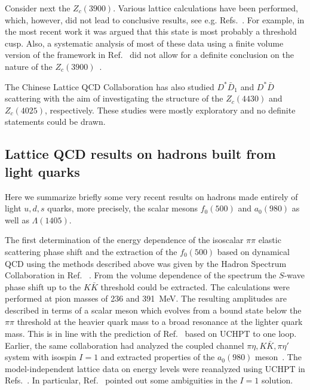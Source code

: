 Consider next the $Z_c(3900)$. Various lattice calculations have
been performed, which, however, did not lead to  conclusive results,
see e.g. 
Refs.~\cite{Prelovsek:2013xba,Prelovsek:2014swa,Chen:2014afa,
Ikeda:2016zwx}. 
For example, in the most recent work \cite{Ikeda:2016zwx} it
was argued that this state is most probably a threshold cusp. Also,
a systematic analysis of most of these data using a finite volume version of 
the framework in Ref.~\cite{Albaladejo:2015lob} did not allow
for a definite conclusion
on the nature of the $Z_c(3900)$~\cite{Albaladejo:2016jsg}.

The Chinese Lattice QCD Collaboration has also studied $D^* \bar D_1$ 
\cite{Meng:2009qt,Chen:2016lkl} and $D^*\bar D$ scattering 
\cite{Chen:2015jwa}
with the aim of investigating the structure
of the $Z_c(4430)$ and $Z_c(4025)$, respectively.  These studies were
mostly exploratory and no definite statements could be drawn.

\subsection{Lattice QCD results on hadrons built from light quarks}
\label{sec:latres2}

Here we summarize briefly some very recent results on hadrons made 
entirely of light $u,d,s$ quarks, more precisely, the scalar mesons 
$f_0(500)$  and $a_0(980)$ as well as $\Lambda(1405)$.

The  first determination of the energy dependence of the isoscalar $\pi\pi$
elastic scattering phase shift and the extraction of the $f_0(500)$ based on
dynamical QCD using the methods described above was given by the Hadron Spectrum
Collaboration in Ref.~ \cite{Briceno:2016mjc}.
From the volume dependence of the spectrum the $S$-wave phase shift up to the
$K\bar K$ threshold could be extracted. The calculations were performed at pion
masses of 236 and 391~MeV. The resulting amplitudes are described in terms of a
scalar meson which evolves from a bound state below the $\pi\pi$ threshold at
the heavier quark mass to a broad resonance at the lighter quark mass.
{This is } in line with the prediction of Ref.~\cite{Hanhart:2008mx} based
on UCHPT to one loop.
 Earlier, the same collaboration had analyzed the coupled channel
$\pi\eta, K\bar K, \pi\eta'$ system with isospin $I=1$ and extracted properties
of the $a_0(980)$ meson~\cite{Dudek:2016cru}. {The model-independent
lattice data on energy levels were reanalyzed using UCHPT in
Refs.~\cite{Guo:2016zep,Doring:2016bdr}.} In particular, Ref.~\cite{Guo:2016zep}
pointed out some ambiguities in the $I=1$ solution.


